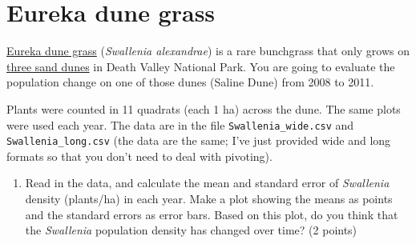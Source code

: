 \documentclass[
]{article}
\newenvironment{Shaded}{\begin{snugshade}}{\end{snugshade}}
\newcommand{\DataTypeTok}[1]{\textcolor[rgb]{0.13,0.29,0.53}{#1}}
\newcommand{\KeywordTok}[1]{\textcolor[rgb]{0.13,0.29,0.53}{\textbf{#1}}}
\newcommand{\NormalTok}[1]{#1}
\newcommand{\OperatorTok}[1]{\textcolor[rgb]{0.81,0.36,0.00}{\textbf{#1}}}
\newcommand{\OtherTok}[1]{\textcolor[rgb]{0.56,0.35,0.01}{#1}}
\newcommand{\StringTok}[1]{\textcolor[rgb]{0.31,0.60,0.02}{#1}}
\providecommand{\tightlist}{%
  \setlength{\itemsep}{0pt}\setlength{\parskip}{0pt}}
\begin{document}
\hypertarget{eureka-dune-grass}{%
\section{Eureka dune grass}\label{eureka-dune-grass}}

\href{https://calscape.org/Swallenia-alexandrae-()}{Eureka dune grass}
(\emph{Swallenia alexandrae}) is a rare bunchgrass that only grows on
\href{https://www.nps.gov/deva/planyourvisit/eureka-dunes.htm}{three
sand dunes} in Death Valley National Park. You are going to evaluate the
population change on one of those dunes (Saline Dune) from 2008 to 2011.

Plants were counted in 11 quadrats (each 1 ha) across the dune. The same
plots were used each year. The data are in the file
\texttt{Swallenia\_wide.csv} and \texttt{Swallenia\_long.csv} (the data
are the same; I've just provided wide and long formats so that you don't
need to deal with pivoting).

\begin{enumerate}
\def\labelenumi{\arabic{enumi}.}
\setcounter{enumi}{1}
\tightlist
\item
  Read in the data, and calculate the mean and standard error of
  \emph{Swallenia} density (plants/ha) in each year. Make a plot showing
  the means as points and the standard errors as error bars. Based on
  this plot, do you think that the \emph{Swallenia} population density
  has changed over time? (2 points)
\end{enumerate}

\begin{Shaded}
\end{Shaded}
\end{document}
